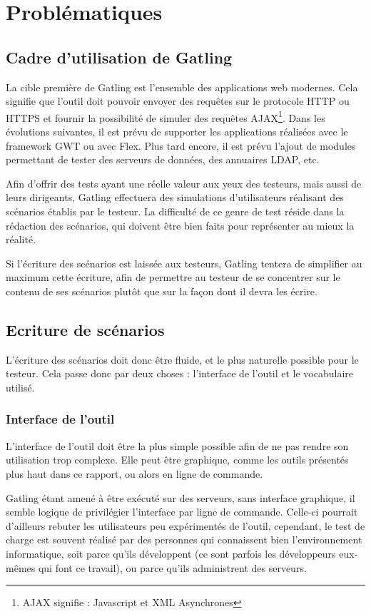 \chapter{Problématiques}
\section{Cadre d'utilisation de Gatling}
La cible première de Gatling est l'ensemble des applications web modernes. Cela signifie que l'outil doit pouvoir envoyer des requêtes sur le protocole HTTP ou HTTPS et fournir la possibilité de simuler des requêtes AJAX\footnote{AJAX signifie  : Javascript et XML Asynchrones}. Dans les évolutions suivantes, il est prévu de supporter les applications réalisées avec le framework GWT ou avec Flex. Plus tard encore, il est prévu l'ajout de modules permettant de tester des serveurs de données, des annuaires LDAP, etc.

Afin d'offrir des tests ayant une réelle valeur aux yeux des testeurs, mais aussi de leurs dirigeants, Gatling effectuera des simulations d'utilisateurs réalisant des scénarios établis par le testeur. La difficulté de ce genre de test réside dans la rédaction des scénarios, qui doivent être bien faits pour représenter au mieux la réalité.

Si l'écriture des scénarios est laissée aux testeurs, Gatling tentera de simplifier au maximum cette écriture, afin de permettre au testeur de se concentrer sur le contenu de ses scénarios plutôt que sur la façon dont il devra les écrire. 

\section{Ecriture de scénarios}
L'écriture des scénarios doit donc être fluide, et le plus naturelle possible pour le testeur. Cela passe donc par deux choses : l'interface de l'outil et le vocabulaire utilisé.

\subsection{Interface de l'outil}
L'interface de l'outil doit être la plus simple possible afin de ne pas rendre son utilisation trop complexe. Elle peut être graphique, comme les outils présentés plus haut dans ce rapport, ou alors en ligne de commande. 

Gatling étant amené à être exécuté sur des serveurs, sans interface graphique, il semble logique de privilégier l'interface par ligne de commande. Celle-ci pourrait d'ailleurs rebuter les utilisateurs peu expérimentés de l'outil, cependant, le test de charge est souvent réalisé par des personnes qui connaissent bien l'environnement informatique, soit parce qu'ils développent (ce sont parfois les développeurs eux-mêmes qui font ce travail), ou parce qu'ils administrent des serveurs.

